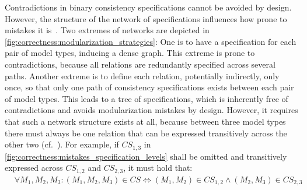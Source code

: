 Contradictions in binary consistency specifications cannot be avoided by design.
However, the structure of the network of specifications influences how prone to mistakes it is~\cite{klare2018docsym}.
Two extremes of networks are depicted in \autoref{fig:correctness:modularization_strategies}:
One is to have a specification for each pair of model types, inducing a dense graph. %
This extreme is prone to contradictions, because all relations are redundantly specified across several paths.
Another extreme is to define each relation, potentially indirectly, only once, so that only one path of consistency specifications exists between each pair of model types.
This leads to a tree of specifications, which is inherently free of contradictions and %
avoids modularization mistakes by design.
However, it requires that such a network structure exists at all, because between three model types there must always be one relation that can be expressed transitively across the other two (cf.~\cite{klare2018docsym}).
For example, if $\mathit{CS}_{1,3}$ in \autoref{fig:correctness:mistakes_specification_levels} shall be omitted and transitively expressed across $\mathit{CS}_{1,2}$ and $\mathit{CS}_{2,3}$, it must hold that:
\begin{align*}
    & \forall M_1, M_2, M_3 : (M_1, M_2, M_3) \in \mathit{CS} \Leftrightarrow (M_1, M_2) \in \mathit{CS}_{1,2} \land (M_2, M_3) \in \mathit{CS}_{2,3}
\end{align*}


